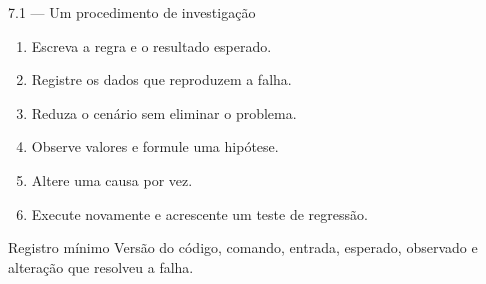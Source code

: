 \begin{frame}{7.1 — Um procedimento de investigação}
\begin{enumerate}
\item Escreva a regra e o resultado esperado.
\item Registre os dados que reproduzem a falha.
\item Reduza o cenário sem eliminar o problema.
\item Observe valores e formule uma hipótese.
\item Altere uma causa por vez.
\item Execute novamente e acrescente um teste de regressão.
\end{enumerate}
\begin{block}{Registro mínimo}
Versão do código, comando, entrada, esperado, observado e alteração que resolveu a falha.
\end{block}
\end{frame}
